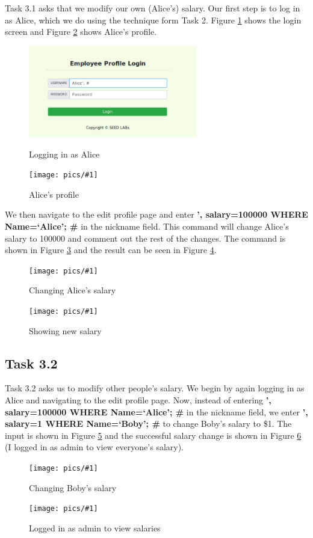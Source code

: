 \documentclass[11pt]{article}
\newcommand{\fig}[2]{ 
\begin{figure}[h]
	\centering
	\caption{#2}
	\texttt{[image: pics/\#1]}
	\label{fig:#1}
\end{figure} 
}
\begin{document}
Task 3.1 asks that we modify our own (Alice's) salary. Our first step is to log in as Alice, which we do using the technique form Task 2. Figure \ref{fig:task3.1} shows the login screen and Figure \ref{fig:task3.2} shows Alice's profile.

\begin{figure}[h]
	\centering
	\caption{Logging in as Alice}
	\includegraphics[width=.75\textwidth, height=4cm, keepaspectratio]{pics/task3.1}
	\label{fig:task3.1}
\end{figure}


\fig{task3.2}{Alice's profile}

We then navigate to the edit profile page and enter {\bf ', salary=100000 WHERE Name=`Alice'; \#} in the nickname field. This command will change Alice's salary to 100000 and comment out the rest of the changes. The command is shown in Figure \ref{fig:task3.3} and the result can be seen in Figure \ref{fig:task3.4}.

\fig{task3.3}{Changing Alice's salary}

\fig{task3.4}{Showing new salary}

\subsection*{Task 3.2}

Task 3.2 asks us to modify other people's salary. We begin by again logging in as Alice and navigating to the edit profile page. Now, instead of entering {\bf ', salary=100000 WHERE Name=`Alice'; \#} in the nickname field, we enter {\bf ', salary=1 WHERE Name=`Boby'; \#} to change Boby's salary to \$1. The input is shown in Figure \ref{fig:task3.6} and the successful salary change is shown in Figure \ref{fig:task3.7} (I logged in as admin to view everyone's salary).


\fig{task3.6}{Changing Boby's salary}

\fig{task3.7}{Logged in as admin to view salaries}
\end{document}
